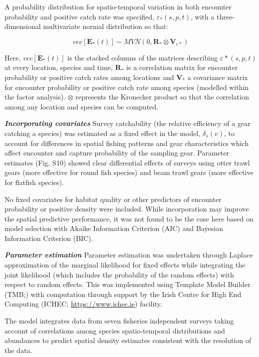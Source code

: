 \documentclass[12pt]{article}
\begin{document}
\begin{linenumbers}
A probability distribution for spatio-temporal variation in both encounter
probability and positive catch rate was specified, $\varepsilon_{*}(s,p,t)$,
with a three-dimensional multivariate normal distribution so that:

	\begin{equation}
		vec[\mathbf{E}_{*}(t)] \sim MVN(0,\mathbf{R}_{*} \otimes
		\mathbf{V}_{{\varepsilon}{*}})
	\end{equation}

Here, $vec[\mathbf{E}_{*}(t)]$ is the stacked columns of the matrices
describing $\varepsilon{*}(s,p,t)$ at every location, species and time,
$\mathbf{R}_{*}$ is a correlation matrix for encounter probability or positive
catch rates among locations and $\mathbf{V}_{*}$ a covariance matrix for
encounter probability or positive catch rate among species (modelled within the
factor analysis). $\otimes$ represents the Kronecker product so that the
correlation among any location and species can be computed\cite{Thorson2017}.
		
\textbf{\textit{Incorporating covariates}} Survey catchability (the relative
efficiency of a gear catching a species) was estimated as a fixed effect in the
model, $\delta_{s}(v)$, to account for differences in spatial fishing patterns
and gear characteristics which affect encounter and capture probability of the
sampling gear\cite{Thorson2014}. Parameter estimates (Fig. S10)
showed clear differential effects of surveys using otter trawl gears (more
effective for round fish species) and beam trawl gears (more effective for
flatfish species).

No fixed covariates for habitat quality or other predictors of encounter
probability or positive density were included. While incorporation may improve
the spatial predictive performance\cite{Thorson2017}, it was not found to be
the case here based on model selection with Akaike Information Criterion (AIC)
and Bayesian Information Criterion (BIC).

\textbf{\textit{Parameter estimation}} Parameter estimation was undertaken
through Laplace approximation of the marginal likelihood for fixed effects
while integrating the joint likelihood (which includes the probability of the
random effects) with respect to random effects. This was implemented using
Template Model Builder (TMB;\cite{Kristensen2015}) with computation through
support by the Irish Centre for High End Computing (ICHEC;
\url{https://www.ichec.ie}) facility.  

The model integrates data from seven fisheries independent surveys taking
account of correlations among species spatio-temporal distributions and
abundances to predict spatial density estimates consistent with the resolution
of the data. 


\end{linenumbers}
\end{document}
